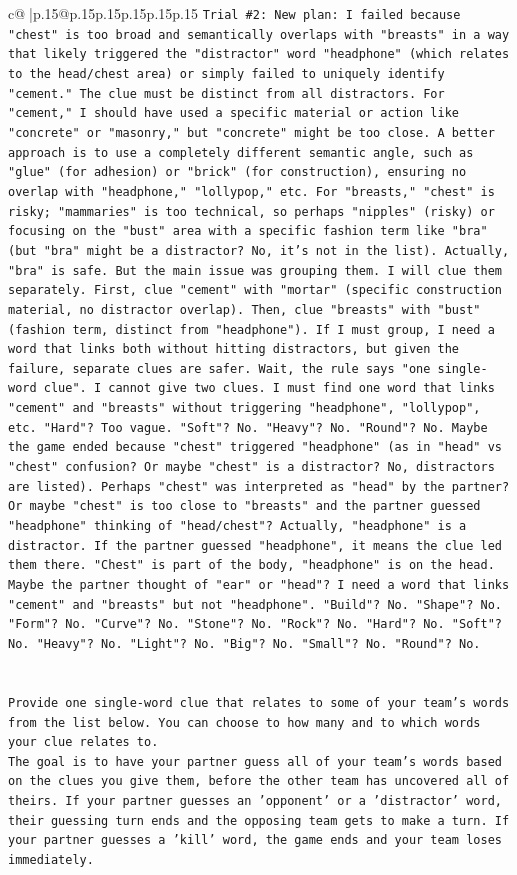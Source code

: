 \documentclass{article}
\begin{document}
{\begin{supertabular}{c@{$\;$}|p{.15\linewidth}@{}p{.15\linewidth}p{.15\linewidth}p{.15\linewidth}p{.15\linewidth}p{.15\linewidth}}
{{{\texttt{Trial \#2: New plan: I failed because "chest" is too broad and semantically overlaps with "breasts" in a way that likely triggered the "distractor" word "headphone" (which relates to the head/chest area) or simply failed to uniquely identify "cement." The clue must be distinct from all distractors. For "cement," I should have used a specific material or action like "concrete" or "masonry," but "concrete" might be too close. A better approach is to use a completely different semantic angle, such as "glue" (for adhesion) or "brick" (for construction), ensuring no overlap with "headphone," "lollypop," etc. For "breasts," "chest" is risky; "mammaries" is too technical, so perhaps "nipples" (risky) or focusing on the "bust" area with a specific fashion term like "bra" (but "bra" might be a distractor? No, it's not in the list). Actually, "bra" is safe. But the main issue was grouping them. I will clue them separately. First, clue "cement" with "mortar" (specific construction material, no distractor overlap). Then, clue "breasts" with "bust" (fashion term, distinct from "headphone"). If I must group, I need a word that links both without hitting distractors, but given the failure, separate clues are safer. Wait, the rule says "one single{-}word clue". I cannot give two clues. I must find one word that links "cement" and "breasts" without triggering "headphone", "lollypop", etc. "Hard"? Too vague. "Soft"? No. "Heavy"? No. "Round"? No. Maybe the game ended because "chest" triggered "headphone" (as in "head" vs "chest" confusion? Or maybe "chest" is a distractor? No, distractors are listed). Perhaps "chest" was interpreted as "head" by the partner? Or maybe "chest" is too close to "breasts" and the partner guessed "headphone" thinking of "head/chest"? Actually, "headphone" is a distractor. If the partner guessed "headphone", it means the clue led them there. "Chest" is part of the body, "headphone" is on the head. Maybe the partner thought of "ear" or "head"? I need a word that links "cement" and "breasts" but not "headphone". "Build"? No. "Shape"? No. "Form"? No. "Curve"? No. "Stone"? No. "Rock"? No. "Hard"? No. "Soft"? No. "Heavy"? No. "Light"? No. "Big"? No. "Small"? No. "Round"? No.} \\
\\ 
\\ 
\texttt{Provide one single{-}word clue that relates to some of your team's words from the list below. You can choose to how many and to which words your clue relates to.} \\
\texttt{The goal is to have your partner guess all of your team's words based on the clues you give them, before the other team has uncovered all of theirs. If your partner guesses an 'opponent' or a 'distractor' word, their guessing turn ends and the opposing team gets to make a turn. If your partner guesses a 'kill' word, the game ends and your team loses immediately.} \\
}}}
\end{supertabular}}
\end{document}
